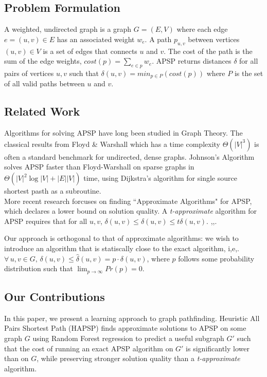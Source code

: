 \documentclass[10.5pt,journal]{IEEEtran}
\begin{document}
\subsection{Problem Formulation}
	A weighted, undirected graph is a graph $G=(E,V)$ where each edge $e=(u,v)\in E$ has an associated weight
	$w_e$. A path $p_{u,v}$ between vertices $(u,v)\in V$ is a set of edges that connects $u$ and $v$. The cost
	of the path is the sum of the edge weights, $cost(p) = \sum_{e\in p}w_e$. APSP returns distances $\delta$
	for all pairs of vertices $u,v$ such that $\delta(u,v) = min_{p\in P} (cost(p))$ where $P$ is the set of
	all valid paths between $u$ and $v$.

\subsection{Related Work}
	Algorithms for solving APSP have long been studied in Graph Theory. The classical results from
	Floyd \& Warshall \cite{floydWarshall}
	which has a time complexity $\Theta(|V|^3)$ is often a standard benchmark for undirected, dense graphs.
	Johnson's Algorithm
	\cite{johnson}
	solves APSP faster than Floyd-Warshall on sparse graphs in $\Theta(|V|^2 \log|V|+ |E||V|)$ time,
	using Dijkstra's algorithm for single source shortest pasth as a subroutine. \\
	
	More recent research forcuses on finding ``Approximate Algorithms" for APSP, which declares a
	lower bound on solution quality. A {\it{t-approximate}} algorithm for APSP requires that
	for all $u,v$, $\delta(u,v) \le \hat{\delta}(u,v) \le t\delta(u,v)$.
	\cite{approx1},\cite{approx2},\cite{neuralNet}.
	
	Our approach is orthogonal to that of approximate algorithms: we wish to introduce an algorithm
	that is statiscally close to the exact algorithm, i,e,. $\forall\,u,v \in G,\, 
	\delta(u,v) \le \hat{\delta}(u,v) = p\cdot\delta(u,v)$, where $p$ follows some probability
	distribution such that $\lim_{p\rightarrow\infty}Pr(p) = 0$.
	
\subsection{Our Contributions}
	In this paper, we present a learning approach to graph pathfinding. Heuristic All Pairs Shortest Path (HAPSP)
	finds approximate solutions to APSP on some graph $G$
	using Random Forest regression to predict a useful subgraph $G'$ such that the cost of running an exact
	APSP algorithm on $G'$ is significantly lower than on $G$, while preserving stronger solution quality
	than a {\it{t-approximate}} algorithm. \\
	
\end{document}
